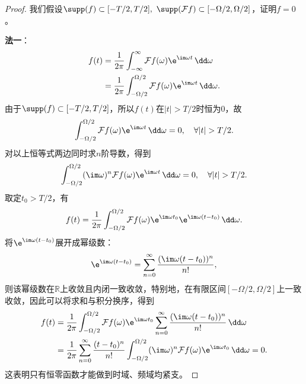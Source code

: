 \begin{proof}
    我们假设$\supp(f)\subset[-T/2,T/2],\ \supp(\mathcal{F}f)\subset[-\Omega/2,\Omega/2]$，证明$f=0$。

    \textbf{法一}：
    \begin{align}
        f(t)&=\frac{1}{2\pi}\int_{-\infty}^{\infty}\mathcal{F} f(\omega)\e^{\im\omega t}\,\dd\omega \nonumber \\
        &=\frac{1}{2\pi}\int_{-\Omega/2}^{\Omega/2}\mathcal{F} f(\omega)\e^{\im\omega t}\,\dd\omega.
    \end{align}
    由于$\supp(f)\subset[-T/2,T/2]$，所以$f(t)$在$|t|>T/2$时恒为$0$，故
    \begin{equation}
        \int_{-\Omega/2}^{\Omega/2}\mathcal{F} f(\omega)\e^{\im\omega t}\,\dd\omega=0,\quad \forall |t|>T/2.
    \end{equation}
    对以上恒等式两边同时求$n$阶导数，得到
    \begin{equation}
        \int_{-\Omega/2}^{\Omega/2}(\im\omega)^n \mathcal{F} f(\omega)\e^{\im\omega t}\,\dd\omega=0,\quad \forall |t|>T/2.
    \end{equation}
    取定$t_0>T/2$，有
    \begin{equation}
        f(t)=\frac{1}{2\pi}\int_{-\Omega/2}^{\Omega/2}\mathcal{F} f(\omega)\e^{\im\omega t_0}\e^{\im\omega (t-t_0)}\,\dd\omega.
    \end{equation}
    将$\e^{\im\omega (t-t_0)}$展开成幂级数：
    \begin{equation}
        \e^{\im\omega (t-t_0)}=\sum_{n=0}^{\infty}\frac{(\im\omega (t-t_0))^n}{n!},
    \end{equation}
    则该幂级数在$\mathbb{R}$上收敛且内闭一致收敛，特别地，在有限区间$[-\Omega/2,\Omega/2]$上一致收敛，因此可以将求和与积分换序，得到
    \begin{align}
        f(t)&=\frac{1}{2\pi}\int_{-\Omega/2}^{\Omega/2}\mathcal{F} f(\omega)\e^{\im\omega t_0}\sum_{n=0}^{\infty}\frac{(\im\omega (t-t_0))^n}{n!}\,\dd\omega \nonumber \\
        &=\frac{1}{2\pi}\sum_{n=0}^{\infty}\frac{(t-t_0)^n}{n!}\int_{-\Omega/2}^{\Omega/2}(\im\omega)^n \mathcal{F} f(\omega)\e^{\im\omega t_0}\,\dd\omega=0.
    \end{align}
    这表明只有恒零函数才能做到时域、频域均紧支。


\end{proof}
